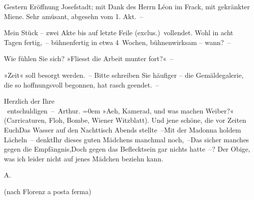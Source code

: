 \pstart
           Gestern Eröffnung Josefstadt; mit Dank des Herrn
                  Léon im Frack, mit gekränkter Miene. Sehr
               amüsant, abgesehn vom 1.
               Akt. –\pend
           
\pstart
           Mein Stück – zwei Akte bis auf
               letzte Feile (exclus.) vollendet. Wohl in acht Tagen fertig, – bühnenfertig in etwa
               4 Wochen, bühnenwirksam – wann? –\pend
           
\pstart
           Wie fühlen Sie sich? »Fliesst die Arbeit munter fort?« –\pend
           
\pstart
           {\pb}»Zeit« soll besorgt werden. – Bitte schreiben Sie häufiger – die
               Gemäldegalerie, die so hoffnungsvoll begonnen, hat rasch geendet. –\pend
           
\pstart
           Herzlich der Ihre{\\[\baselineskip]}\spacefill\mbox{ entschuldigen – Arthur.}\pend
           \leftskip=0em{}
\pstart
           \noindent{}»Aeh, Kamerad, und was machen Weiber?« (Carricaturen, Floh, Bombe, Wiener
                     Witzblatt).\pend
           \stanza{}Und jene schöne, die vor Zeiten EuchDas Wasser auf den Nachttisch Abends stellte –Mit der Madonna holdem Lächeln – denktIhr dieses guten Mädchens manchmal noch, –Das sicher manches gegen die Empfängnis,Doch gegen das Beflecktsein gar nichts hatte –?\stanzaend{}
\pstart
           Der Obige, was ich leider nicht auf jenes Mädchen beziehn kann.\pend
           
\pstart
           \spacefill\mbox{A.}\pend
           
\pstart
           (nach Florenz a posta ferma)\pend
           \endnumbering{}  
      